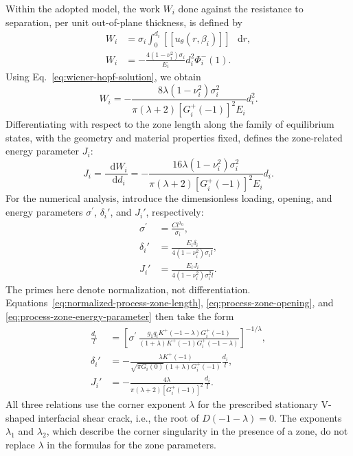 \documentclass[pdflatex,iicol,sn-mathphys-ay]{sn-jnl}
\newcommand{\dd}{\mathop{}\!\mathrm{d}}
\newcommand{\sigmap}{\sigma^{\prime}}
\newcommand{\jump}[1]{\left[\!\left[#1\right]\!\right]}
\begin{document}
Within the adopted model, the work $W_i$ done against the resistance
to separation, per unit out-of-plane thickness, is defined
by~\citep{Cherepanov1986}
\begin{equation*}
\begin{aligned}
  W_i&=\sigma_i\int_0^{d_i}
      \jump{u_\theta(r,\beta_i)}\,\dd r,\\
  W_i&=-\frac{4(1-\nu_i^2)\sigma_i}{E_i}
       d_i^2\Phi_i^-(1).
\end{aligned}
\end{equation*}
Using Eq.~\eqref{eq:wiener-hopf-solution}, we obtain
\begin{equation*}
  W_i=-\frac{8\lambda(1-\nu_i^2)\sigma_i^2}
  {\pi(\lambda+2)[G_i^+(-1)]^2E_i}d_i^2.
\end{equation*}
Differentiating with respect to the zone length along the family of
equilibrium states, with the geometry and material properties fixed,
defines the zone-related energy parameter $J_i$:
\begin{equation}
\label{eq:process-zone-energy-parameter}
  J_i=\frac{\dd W_i}{\dd d_i}
  =-\frac{16\lambda(1-\nu_i^2)\sigma_i^2}
  {\pi(\lambda+2)[G_i^+(-1)]^2E_i}d_i.
\end{equation}
For the numerical analysis, introduce the dimensionless loading,
opening, and energy parameters $\sigmap$, $\delta_i'$, and $J_i'$,
respectively:
\begin{equation*}
\begin{aligned}
  \sigmap&=\frac{Cl^{\lambda_0}}{\sigma_i},\\
  \delta_i'&=\frac{E_i\delta_i}
  {4(1-\nu_i^2)\sigma_i l},\\
  J_i'&=\frac{E_iJ_i}
  {4(1-\nu_i^2)\sigma_i^2l}.
\end{aligned}
\end{equation*}
The primes here denote normalization, not differentiation.
Equations~\eqref{eq:normalized-process-zone-length},
\eqref{eq:process-zone-opening}, and
\eqref{eq:process-zone-energy-parameter} then take the form
\begin{equation*}
\begin{aligned}
  \frac{d_i}{l}
    &=\left[
      \sigmap\,
      \frac{g_1q_iK^+(-1-\lambda)G_i^+(-1)}
      {(1+\lambda)K^+(-1)G_i^+(-1-\lambda)}
    \right]^{-1/\lambda},\\[2pt]
  \delta_i'
    &=-\frac{\lambda K^+(-1)}
      {\sqrt{\pi G_i(0)}(1+\lambda)G_i^+(-1)}
      \frac{d_i}{l},\\[2pt]
  J_i'
    &=-\frac{4\lambda}
      {\pi(\lambda+2)[G_i^+(-1)]^2}
      \frac{d_i}{l}.
\end{aligned}
\end{equation*}
All three relations use the corner exponent $\lambda$ for the prescribed
stationary V-shaped interfacial shear crack, i.e., the root of
$D(-1-\lambda)=0$.
The exponents $\lambda_1$ and $\lambda_2$, which describe the corner
singularity in the presence of a zone, do not replace $\lambda$
in the formulas for the zone parameters.
\end{document}
